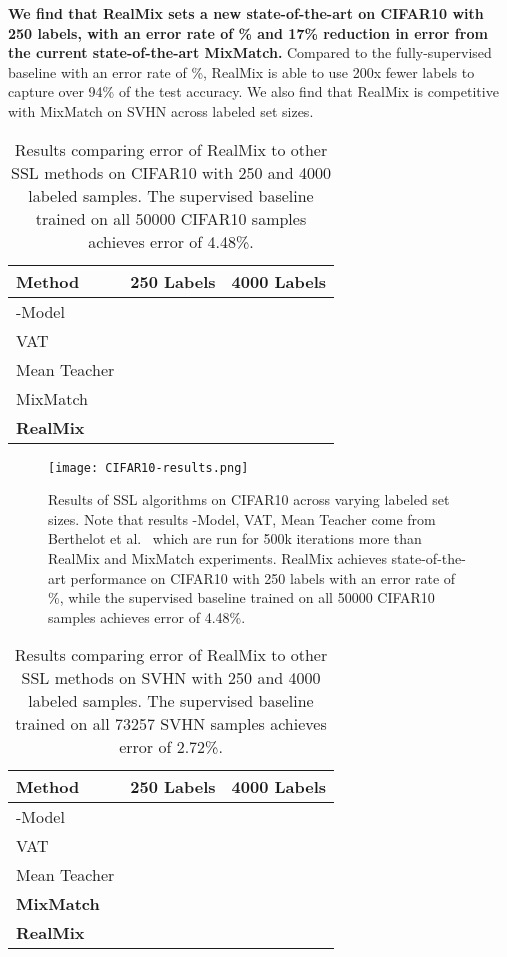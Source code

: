 \documentclass[10pt,twocolumn,letterpaper]{article}
\begin{document}
\textbf{We find that RealMix sets a new state-of-the-art on CIFAR10 with 250 labels, with an error rate of \% and 17\% reduction in error from the current state-of-the-art MixMatch.} Compared to the fully-supervised baseline with an error rate of \%, RealMix is able to use 200x fewer labels to capture over 94\% of the test accuracy. We also find that RealMix is competitive with MixMatch on SVHN across labeled set sizes.
\begin{center}
\begin{table}[h]
\centering
\begin{tabular}{lrr}
    \hline
      Method & 250 Labels & 4000 Labels \\ \hline
      -Model ~\cite{temporalensemblingLaine} &  & \\
      VAT ~\cite{vatMiyato} &  & \\
      Mean Teacher \cite{meanteacherTarvainen} &  & \\
      MixMatch \cite{mixmatchBerthelot} &  &   \\\hline
      \textbf{RealMix}    &  &  \\
    \end{tabular}
\caption{Results comparing error of RealMix to other SSL methods on CIFAR10 with 250 and 4000 labeled samples. The supervised baseline trained on all 50000 CIFAR10 samples achieves error of 4.48\%.}
\label{table:cifar10}
\vskip -0.3in
\end{table}
\end{center}

\begin{figure}[t!]
    \texttt{[image: CIFAR10-results.png]}
    \caption{Results of SSL algorithms on CIFAR10 across varying labeled set sizes. Note that results -Model, VAT, Mean Teacher come from Berthelot et al.~\cite{mixmatchBerthelot} which are run for 500k iterations more than RealMix and MixMatch experiments. RealMix achieves state-of-the-art performance on CIFAR10 with 250 labels with an error rate of \%, while the supervised baseline trained on all 50000 CIFAR10 samples achieves error of 4.48\%.}
    \label{fig:CIFAR10-results}
\end{figure}

\begin{table}[h]
\centering
\begin{tabular}{lrr}
    \hline
      Method & 250 Labels & 4000 Labels \\ \hline
      -Model~\cite{temporalensemblingLaine}  &  & \\
      VAT ~\cite{vatMiyato}  &  & \\
      Mean Teacher \cite{meanteacherTarvainen} &  & \\
      \textbf{MixMatch} \cite{mixmatchBerthelot} &  &   \\\hline
      \textbf{RealMix} &  &  \\
\end{tabular}
\caption{Results comparing error of RealMix to other SSL methods on SVHN with 250 and 4000 labeled samples. The supervised baseline trained on all 73257 SVHN samples achieves error of 2.72\%.}
\label{table:svhn}
\end{table}
\end{document}
